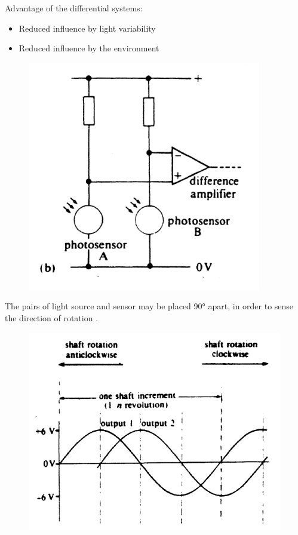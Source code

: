 \documentclass[class=report, crop=false, 12pt,a4paper]{standalone}
\begin{document}
Advantage of the differential systems:
\begin{itemize}
  \item Reduced influence by light variability
  \item Reduced influence by the environment
\end{itemize}
\begin{figure}[H]
  \centering
  \includegraphics[width = 0.45 \textwidth]{../img/Mdiagram15.PNG}
\end{figure}
The pairs of light source and sensor may be placed 90\si{\degree} apart, in order to sense the direction of rotation .
\begin{figure}[H]
  \centering
  \includegraphics[width = 0.55 \textwidth]{../img/Mdiagram16.PNG}
\end{figure}
\end{document}
